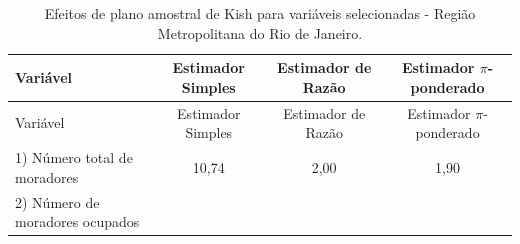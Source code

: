 \documentclass[]{book}
\theoremstyle{definition}
\theoremstyle{definition}
\theoremstyle{definition}
\theoremstyle{remark}
\begin{document}
\begin{longtable}[]{@{}lccc@{}}
\caption{\label{tab:epakish} Efeitos de plano amostral de Kish para
variáveis selecionadas - Região Metropolitana do Rio de
Janeiro.}\tabularnewline
\toprule
\begin{minipage}[b]{0.24\columnwidth}\raggedright\strut
Variável\strut
\end{minipage} & \begin{minipage}[b]{0.19\columnwidth}\centering\strut
Estimador Simples\strut
\end{minipage} & \begin{minipage}[b]{0.20\columnwidth}\centering\strut
Estimador de Razão\strut
\end{minipage} & \begin{minipage}[b]{0.26\columnwidth}\centering\strut
Estimador \(\pi\)-ponderado\strut
\end{minipage}\tabularnewline
\midrule
\endfirsthead
\toprule
\begin{minipage}[b]{0.24\columnwidth}\raggedright\strut
Variável\strut
\end{minipage} & \begin{minipage}[b]{0.19\columnwidth}\centering\strut
Estimador Simples\strut
\end{minipage} & \begin{minipage}[b]{0.20\columnwidth}\centering\strut
Estimador de Razão\strut
\end{minipage} & \begin{minipage}[b]{0.26\columnwidth}\centering\strut
Estimador \(\pi\)-ponderado\strut
\end{minipage}\tabularnewline
\midrule
\endhead
\begin{minipage}[t]{0.24\columnwidth}\raggedright\strut
1) Número total de moradores\strut
\end{minipage} & \begin{minipage}[t]{0.19\columnwidth}\centering\strut
10,74\strut
\end{minipage} & \begin{minipage}[t]{0.20\columnwidth}\centering\strut
2,00\strut
\end{minipage} & \begin{minipage}[t]{0.26\columnwidth}\centering\strut
1,90\strut
\end{minipage}\tabularnewline
\begin{minipage}[t]{0.24\columnwidth}\raggedright\strut
2) Número de moradores ocupados\strut
\end{minipage} & \begin{minipage}[t]{0.19\columnwidth}\centering\strut

\end{minipage}
\end{longtable}
\end{document}
